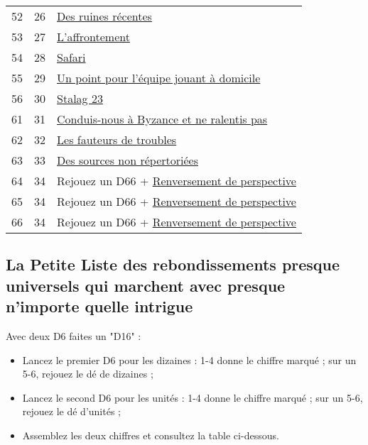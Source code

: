 \begin{center}
\begin{tabular}{ccl}
52 & 26 & \hyperref[ruines]{Des ruines récentes} \\
53 & 27 & \hyperref[affrontement]{L’affrontement} \\
54 & 28 & \hyperref[safari]{Safari} \\
55 & 29 & \hyperref[domicile]{Un point pour l’équipe jouant à domicile} \\
56 & 30 & \hyperref[stalag]{Stalag 23} \\
61 & 31 & \hyperref[byzance]{Conduis-nous à Byzance et ne ralentis pas} \\
62 & 32 & \hyperref[troubles]{Les fauteurs de troubles} \\
63 & 33 & \hyperref[sources]{Des sources non répertoriées} \\
64 & 34 & Rejouez un D66 + \hyperref[renversement]{Renversement de perspective} \\
65 & 34 & Rejouez un D66 + \hyperref[renversement]{Renversement de perspective} \\
66 & 34 & Rejouez un D66 + \hyperref[renversement]{Renversement de perspective} \\
\end{tabular}
\end{center}

\newpage

\subsection*{La Petite Liste des rebondissements presque universels qui marchent avec presque n'importe quelle intrigue}
\label{petiteliste}

Avec deux D6 faites un "D16" :
\begin{itemize}
\item Lancez le premier D6 pour les dizaines : 1-4 donne le chiffre marqué ; sur un 5-6, rejouez le dé de dizaines ;
\item Lancez le second D6 pour les unités : 1-4 donne le chiffre marqué ; sur un 5-6, rejouez le dé d'unités ;
\item Assemblez les deux chiffres et consultez la table ci-dessous.
\end{itemize}

\vspace{0.3cm}

